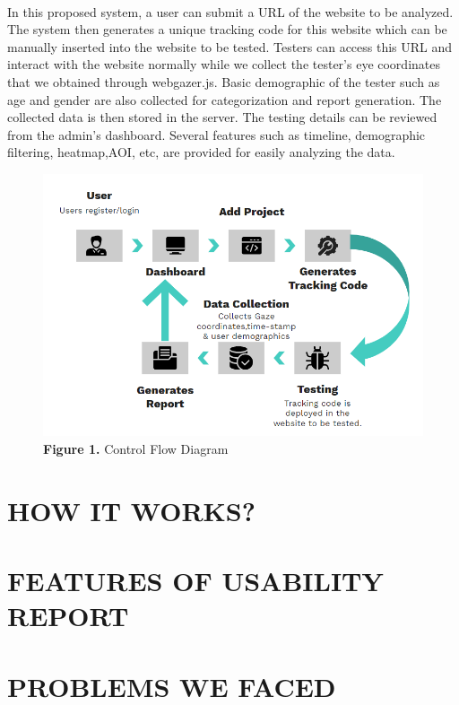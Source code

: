 \documentclass[a4paper,12pt,oneside]{article}
\begin{document}
\paragraph{}
In this proposed system, a user can submit a URL of the website to be analyzed. The system then generates a unique tracking code for this website which can be manually inserted into the website to be tested.
Testers can access this URL and interact with the website normally while we collect the tester's eye coordinates that we obtained through webgazer.js. Basic demographic of the tester such as age and gender are also collected for categorization and report generation. The collected data is then stored in the server. 
The testing details can be reviewed from the admin's dashboard. Several features such as timeline, demographic filtering, heatmap,AOI, etc, are provided for easily analyzing the data.
\begin{figure}[H]
    \centering
    \includegraphics[width=\linewidth]{proposed-method.png}
    \caption{\textbf{Figure 1.} Control Flow Diagram}
    \label{fig:dfd}
    \label{}
\end{figure}

\newpage
\section{HOW IT WORKS?}

\newpage
\section{FEATURES OF USABILITY REPORT}

\newpage
\section{PROBLEMS WE FACED}
\end{document}
